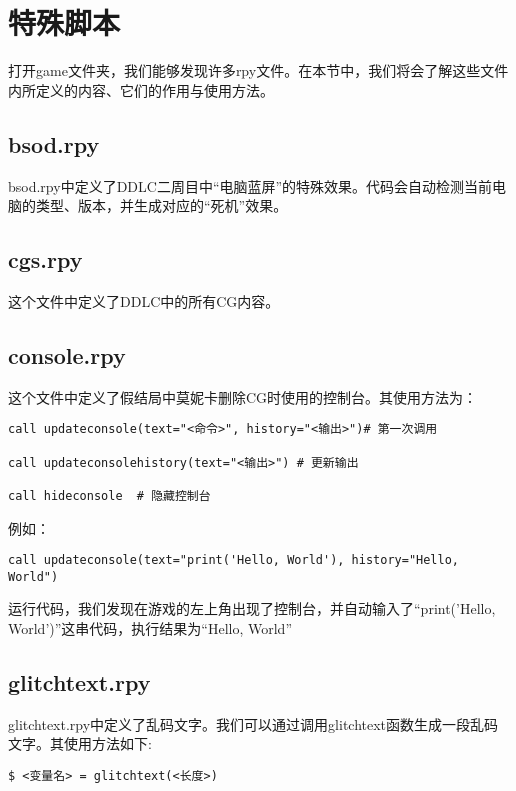 \documentclass[../../Main.tex]{subfiles}
\begin{document}
\section{特殊脚本}

打开game文件夹，我们能够发现许多rpy文件。在本节中，我们将会了解这些文件内所定义的内容、它们的作用与使用方法。

\subsection{bsod.rpy}

bsod.rpy中定义了DDLC二周目中“电脑蓝屏”的特殊效果。代码会自动检测当前电脑的类型、版本，并生成对应的“死机”效果。


\subsection{cgs.rpy}

这个文件中定义了DDLC中的所有CG内容。


\subsection{console.rpy}

这个文件中定义了假结局中莫妮卡删除CG时使用的控制台。其使用方法为：
\begin{lstlisting}
call updateconsole(text="<命令>", history="<输出>")# 第一次调用

call updateconsolehistory(text="<输出>") # 更新输出

call hideconsole  # 隐藏控制台
\end{lstlisting}

例如：
\begin{lstlisting}
call updateconsole(text="print('Hello, World'), history="Hello, World")
\end{lstlisting}

运行代码，我们发现在游戏的左上角出现了控制台，并自动输入了“print('Hello, World')”这串代码，执行结果为“Hello, World”

\subsection{glitchtext.rpy}

glitchtext.rpy中定义了乱码文字。我们可以通过调用glitchtext函数生成一段乱码文字。其使用方法如下:
\begin{lstlisting}
$ <变量名> = glitchtext(<长度>)
\end{lstlisting}
\end{document}
